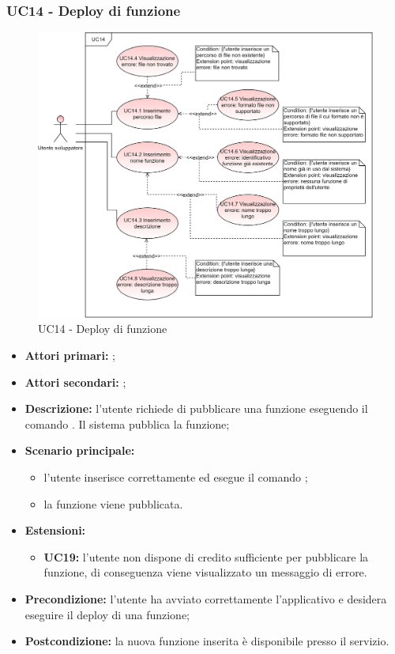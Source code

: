 \subsubsection{UC14 - Deploy di funzione}
\begin{figure}[h]
	\centering
	\includegraphics[scale=\ucs]{./res/img/UC14.png}
	\caption {UC14 - Deploy di funzione}
\end{figure}
\begin{itemize}
	\item \textbf{Attori primari:} \us{};
	\item \textbf{Attori secondari:} \re{};
	\item \textbf{Descrizione:} l’utente richiede di pubblicare una funzione eseguendo il comando \pdeploy{}. Il sistema pubblica la funzione; 
	\item \textbf{Scenario principale:} 
	\begin{itemize}
		\item l'utente inserisce correttamente ed esegue il comando \pdeploy{};
		\item la funzione viene pubblicata. 
	\end{itemize}
	\item \textbf{Estensioni:} 
	\begin{itemize}
		\item \textbf{UC19:} l’utente non dispone di credito sufficiente per pubblicare la funzione, di conseguenza viene visualizzato un messaggio di errore. 
	\end{itemize}
	\item \textbf{Precondizione:} l’utente ha avviato correttamente l’applicativo e desidera eseguire il deploy di una funzione; 
	\item \textbf{Postcondizione:} la nuova funzione inserita è disponibile presso il servizio. 
\end{itemize}